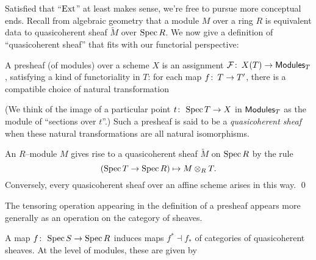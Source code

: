 Satisfied that ``$\operatorname{Ext}$'' at least makes sense, we're free to pursue more conceptual ends.  Recall from algebraic geometry that a module $M$ over a ring $R$ is equivalent data to quasicoherent sheaf $\widetilde{M}$ over $\operatorname{Spec} R$.  We now give a definition of ``quasicoherent sheaf'' that fits with our functorial perspective:
\begin{definition}\label{DefnQCohSheaves}
A presheaf (of modules) over a scheme $X$ is an assignment $\mathcal{F}\colon\thinspace X(T) \to \mathsf{Modules}_T$, satisfying a kind of functoriality in $T$: for each map $f\colon\thinspace T \to T'$, there is a compatible choice of natural transformation
\begin{center}
\end{center}
(We think of the image of a particular point $t\colon\thinspace \operatorname{Spec} T \to X$ in $\mathsf{Modules}_T$ as the module of ``sections over $t$''.)  Such a presheaf is said to be a \textit{quasicoherent sheaf} when these natural transformations are all natural isomorphisms.
\end{definition}

\begin{lemma}\label{CorrespondenceQCohAndModules}
An $R$--module $M$ gives rise to a quasicoherent sheaf $\widetilde M$ on $\operatorname{Spec} R$ by the rule \[(\operatorname{Spec} T \to \operatorname{Spec} R) \mapsto M \otimes_R T.\]  Conversely, every quasicoherent sheaf over an affine scheme arises in this way.  \qed
\end{lemma}

The tensoring operation appearing in the definition of a presheaf appears more generally as an operation on the category of sheaves.

\begin{definition}\label{PushAndPullForQCohOnAffines}
A map $f\colon\thinspace \operatorname{Spec} S \to \operatorname{Spec} R$ induces maps $f^* \dashv f_*$ of categories of quasicoherent sheaves.  At the level of modules, these are given by
\begin{center}
\end{center}
\end{definition}

